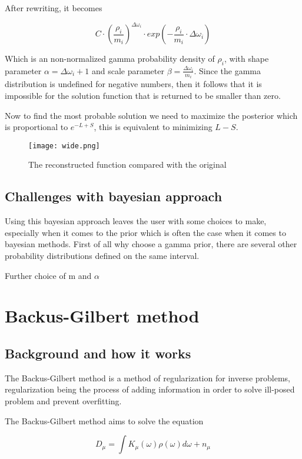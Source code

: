 \documentclass[a4paper, oneside, 12pt]{book}
\begin{document}
After rewriting, it becomes

\begin{equation}
C \cdot (\frac{\rho_{i}}{m_{i}})^{\Delta\omega_{i}} \cdot exp(-\frac{\rho_{i}}{m_{i}}\cdot\Delta\omega_{i})
\end{equation}

Which is an non-normalized gamma probability density of $\rho_{i}$, with shape parameter $\alpha = \Delta\omega_{i}+1$ and scale parameter $\beta = \frac{\Delta\omega_{i}}{m_{i}}$. Since the gamma distribution is undefined for negative numbers, then it follows that it is impossible for the solution function that is returned to be smaller than zero.

Now to find the most probable solution we need to maximize the posterior which is proportional to $e^{-L+S}$, this is equivalent to minimizing $L-S$.

\begin{figure}[H]
\texttt{[image: wide.png]}
\caption{The reconstructed function compared with the original}
\end{figure}

\section{Challenges with bayesian approach}
Using this bayesian approach leaves the user with some choices to make, especially when it comes to the prior which is often the case when it comes to bayesian methods. First of all why choose a gamma prior, there are several other probability distributions defined on the same interval. 

Further choice of m and $\alpha$
\chapter{Backus-Gilbert method}

\section{Background and how it works}
The Backus-Gilbert method is a method of regularization for inverse problems, regularization being the process of adding information in order to solve ill-posed problem and prevent overfitting.

The Backus-Gilbert method aims to solve the equation

\begin{equation}
\label{eq:BG}
D_{\mu}=\int K_{\mu}(\omega)\rho(\omega)d\omega+n_{\mu}
\end{equation}
\end{document}
